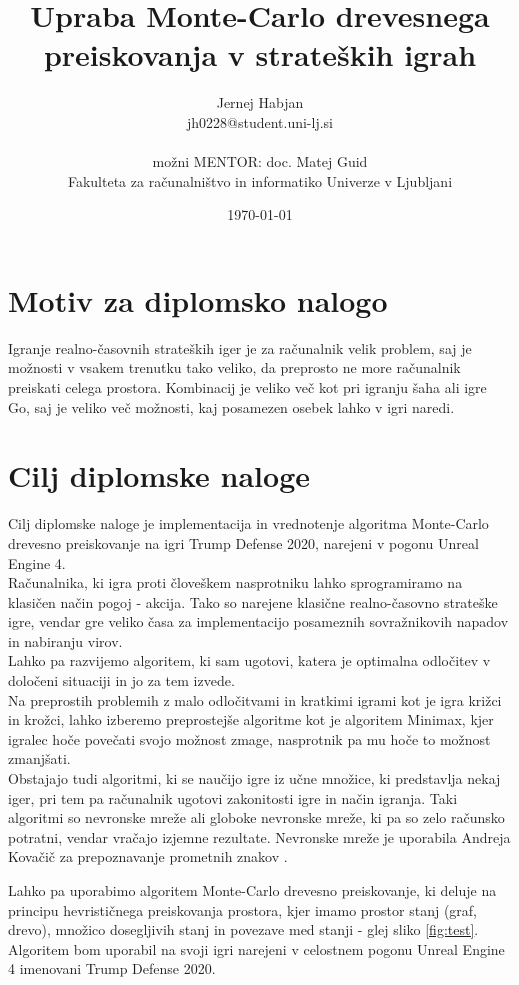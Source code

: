 \documentclass[11pt,a4paper]{article}
\title{Upraba Monte-Carlo drevesnega preiskovanja v strateških igrah}
\author{Jernej Habjan\\
jh0228@student.uni-lj.si\\
\ \\
možni MENTOR: doc. Matej Guid \\
Fakulteta za računalništvo in informatiko Univerze v Ljubljani
\date{\today}         
}
\begin{document}
\maketitle

\section{Motiv za diplomsko nalogo}
Igranje realno-časovnih strateških iger je za računalnik velik problem, saj je možnosti v vsakem trenutku tako veliko, da preprosto ne more računalnik preiskati celega prostora.
Kombinacij je veliko več kot pri igranju šaha ali igre Go, saj je veliko več možnosti, kaj posamezen osebek lahko v igri naredi.

\section{Cilj diplomske naloge}
Cilj diplomske naloge je implementacija in vrednotenje algoritma Monte-Carlo drevesno preiskovanje na igri Trump Defense 2020, narejeni v pogonu Unreal Engine 4.\\


Računalnika, ki igra proti človeškem nasprotniku lahko sprogramiramo na klasičen način pogoj - akcija.
Tako so narejene klasične realno-časovno strateške igre, vendar gre veliko časa za implementacijo posameznih sovražnikovih napadov in nabiranju virov.\\
Lahko pa razvijemo algoritem, ki sam ugotovi, katera je optimalna odločitev v določeni situaciji in jo za tem izvede.\\
Na preprostih problemih z malo odločitvami in kratkimi igrami kot je igra križci in krožci, lahko izberemo preprostejše algoritme kot je algoritem Minimax, kjer igralec hoče povečati svojo možnost zmage, nasprotnik pa mu hoče to možnost zmanjšati.\\
Obstajajo tudi algoritmi, ki se naučijo igre iz učne množice, ki predstavlja nekaj iger, pri tem pa računalnik ugotovi zakonitosti igre in način igranja. Taki algoritmi so nevronske mreže ali globoke nevronske mreže, ki pa so zelo računsko potratni, vendar vračajo izjemne rezultate. Nevronske mreže je uporabila Andreja Kovačič za prepoznavanje prometnih znakov \cite{diploma1}.

Lahko pa uporabimo algoritem Monte-Carlo drevesno preiskovanje, ki deluje na principu hevrističnega preiskovanja prostora, kjer imamo prostor stanj (graf, drevo), množico dosegljivih stanj in povezave med stanji - glej sliko \ref{fig:test}.\\
Algoritem bom uporabil na svoji igri narejeni v celostnem pogonu Unreal Engine 4 imenovani Trump Defense 2020.
\end{document}
